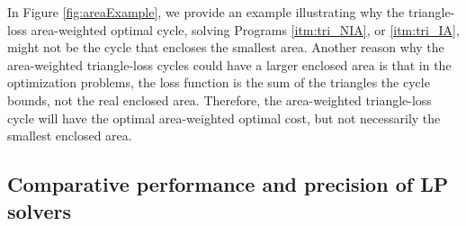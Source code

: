 In Figure \ref{fig:areaExample}, we provide an example illustrating why the triangle-loss area-weighted optimal cycle, solving Programs \ref{itm:tri_NIA}, or
\ref{itm:tri_IA}, might not be the cycle that encloses the smallest area. Another reason why the area-weighted triangle-loss cycles could have a larger enclosed area is that in the optimization problems, the loss function is the sum of the triangles the cycle bounds, not the real enclosed area. Therefore, the area-weighted triangle-loss cycle will have the optimal area-weighted optimal cost, but not necessarily the smallest enclosed area. 

 
\subsection{Comparative performance and precision of LP solvers}\label{Computational cost of the various optimization techniques}

\DIFaddbegin {}

